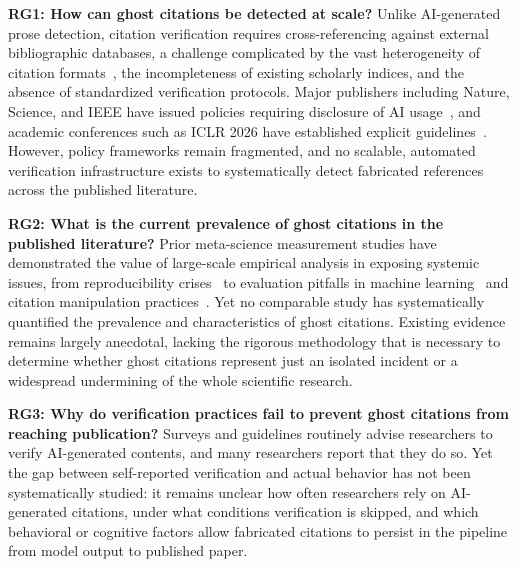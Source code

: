 \noindent
\textbf{RG1: How can ghost citations be detected at scale?}
Unlike AI-generated prose detection, citation verification requires cross-referencing against external bibliographic databases, a challenge complicated by the vast heterogeneity of citation formats~\cite{ISO690_2021}, the incompleteness of existing scholarly indices, and the absence of standardized verification protocols.
Major publishers including Nature, Science, and IEEE have issued policies requiring disclosure of AI usage~\cite{nature2023tools,thorp2023chatgpt,ieee2025ai-policy}, and academic conferences such as ICLR 2026 have established explicit guidelines~\cite{chairs2025iclr}.
However, policy frameworks remain fragmented, and no scalable, automated verification infrastructure exists to systematically detect fabricated references across the published literature.

\noindent
\textbf{RG2: What is the current prevalence of ghost citations in the published literature?}
Prior meta-science measurement studies have demonstrated the value of large-scale empirical analysis in exposing systemic issues, from reproducibility crises~\cite{baker2016reproducibility,ioannidis2005most} to evaluation pitfalls in machine learning~\cite{lipton2018troubling,wagstaff2012machine} and citation manipulation practices~\cite{fister2016toward}.
Yet no comparable study has systematically quantified the prevalence and characteristics of ghost citations.
Existing evidence remains largely anecdotal, lacking the rigorous methodology that is necessary to determine whether ghost citations represent just an isolated incident or a widespread undermining of the whole scientific research.

\noindent
\textbf{RG3: Why do verification practices fail to prevent ghost citations from reaching publication?}
Surveys and guidelines routinely advise researchers to verify AI-generated contents\cite{cotton2024chatting,dwivedi2023so}, and many researchers report that they do so\cite{lee2025impact}.
Yet the gap between self-reported verification and actual behavior has not been systematically studied: it remains unclear how often researchers rely on AI-generated citations, under what conditions verification is skipped, and which behavioral or cognitive factors allow fabricated citations to persist in the pipeline from model output to published paper.

